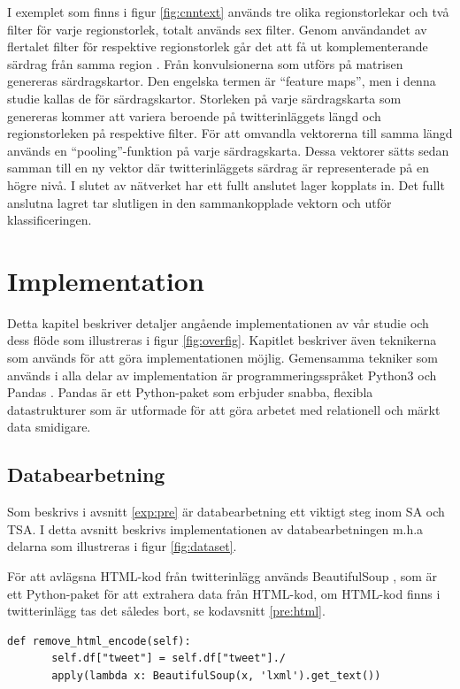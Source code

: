 \documentclass{kaumasters} %
\begin{document}
I exemplet som finns i figur \ref{fig:cnntext} används tre olika regionstorlekar och två filter för varje regionstorlek, totalt används sex filter. Genom användandet av flertalet filter för respektive regionstorlek går det att få ut komplementerande särdrag från samma region \cite{cnn:002}. Från konvulsionerna som utförs på matrisen genereras särdragskartor. Den engelska termen är “feature maps”, men i denna studie kallas de för särdragskartor.  Storleken på varje särdragskarta som genereras kommer att variera beroende på twitterinläggets längd och regionstorleken på respektive filter. För att omvandla vektorerna till samma längd används en “pooling”-funktion på varje särdragskarta. Dessa vektorer sätts sedan samman till en ny vektor där twitterinläggets särdrag är representerade på en högre nivå. I slutet av nätverket har ett fullt anslutet lager kopplats in. Det fullt anslutna lagret tar slutligen in den sammankopplade vektorn och utför klassificeringen.



\section{Implementation}\label{impl}
Detta kapitel beskriver detaljer angående implementationen av vår studie och dess flöde som illustreras i figur \ref{fig:overfig}. Kapitlet beskriver även teknikerna som används för att göra implementationen möjlig. Gemensamma tekniker som används i alla delar av implementation är programmeringsspråket Python3 \cite{impl:001} och Pandas \cite{impl:002}. Pandas är ett Python-paket som erbjuder snabba, flexibla datastrukturer som är utformade för att göra arbetet med relationell och märkt data smidigare. 
\subsection{Databearbetning}\label{impl:pre}
Som beskrivs i avsnitt \ref{exp:pre} är databearbetning ett viktigt steg inom SA och TSA. I detta avsnitt beskrivs implementationen av databearbetningen m.h.a delarna som illustreras i figur \ref{fig:dataset}.

För att avlägsna HTML-kod från twitterinlägg används BeautifulSoup \cite{impl:004}, som är ett Python-paket för att extrahera data från HTML-kod, om HTML-kod finns i twitterinlägg tas det således bort, se kodavsnitt \ref{pre:html}.
\begin{lstlisting}[style=mypython,caption={Funktion för att avlägsna HTML-kod.},label=pre:html]
def remove_html_encode(self):
       self.df["tweet"] = self.df["tweet"]./
       apply(lambda x: BeautifulSoup(x, 'lxml').get_text())
\end{lstlisting}
\end{document}

